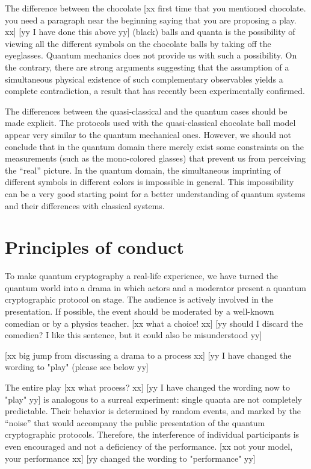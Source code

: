 \documentclass[prb,amssymb,preprint]{revtex4}
\begin{document}
The difference between the chocolate
[xx first time that you
mentioned chocolate. you need a paragraph near the beginning saying
that you are proposing a play. xx]
[yy I have done this above yy]
 (black) balls and quanta is the
possibility of viewing all the different symbols on the chocolate balls by
taking off the eyeglasses. Quantum mechanics does not provide us with such a
possibility. On the contrary, there are strong arguments suggesting that
the assumption of a simultaneous physical existence\cite{epr} of such
complementary observables yields a complete
contradiction,\cite{kochen1,ghz,ghsz} a result that has recently been
experimentally confirmed.\cite{panbdwz}

The differences between the quasi-classical and the quantum cases should be
made explicit. The protocols used with the quasi-classical
chocolate ball model appear very similar to the quantum mechanical ones.
However, we should not conclude that in the quantum domain
there merely exist some constraints on the measurements (such as the
mono-colored glasses) that prevent us from perceiving the ``real''
picture. In the quantum domain, the simultaneous imprinting of different
symbols in different colors is impossible in general. This impossibility
can be a very good starting point for a better understanding of quantum
systems and their differences with classical systems.

\section{Principles of conduct}

To make quantum cryptography a real-life experience, we have turned the
quantum world into a drama in which actors and a moderator present
a quantum cryptographic protocol on stage.\cite{quote} The audience is
actively involved in the presentation. If
possible, the event should be moderated by a well-known comedian or by a
physics teacher. [xx what a choice! xx]
[yy should I discard the comedien? I like this sentence, but it could also be misunderstood yy]

[xx big jump from discussing a drama to a process xx]
[yy I have changed the wording to "play" (please see below yy]

The entire play
[xx what process? xx]
[yy I have changed the wording now to "play" yy]
is analogous to a surreal
experiment: single quanta are not completely
predictable. Their behavior is determined by random events, and marked by
the ``noise'' that would accompany the public presentation of the quantum
cryptographic protocols. Therefore, the interference of individual
participants is even encouraged and not a deficiency of the performance.
[xx not your model, your performance xx]
[yy changed the wording to "performance" yy]
\end{document}

